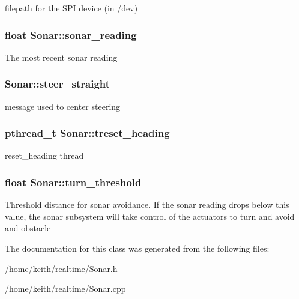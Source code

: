 filepath for the S\-P\-I device (in /dev) \hypertarget{classSonar_abd3f8ccfc42cacd700df9be06f70c6b2}{
\subsubsection[{sonar\-\_\-reading}]{\setlength{\rightskip}{0pt plus 5cm}float Sonar\-::sonar\-\_\-reading\hspace{0.3cm}{\ttfamily [protected]}}}\label{classSonar_abd3f8ccfc42cacd700df9be06f70c6b2}
The most recent sonar reading \hypertarget{classSonar_a9e6e96435c6767549c91d9e67d20161b}{
\subsubsection[{steer\-\_\-straight}]{ Sonar\-::steer\-\_\-straight\hspace{0.3cm}{\ttfamily [protected]}}}\label{classSonar_a9e6e96435c6767549c91d9e67d20161b}
message used to center steering \hypertarget{classSonar_af3ec5683614e9f1755e54da32184412a}{
\subsubsection[{treset\-\_\-heading}]{\setlength{\rightskip}{0pt plus 5cm}pthread\-\_\-t Sonar\-::treset\-\_\-heading\hspace{0.3cm}{\ttfamily [protected]}}}\label{classSonar_af3ec5683614e9f1755e54da32184412a}
reset\-\_\-heading thread \hypertarget{classSonar_a83151cbccbce08be16dfec04a53f3295}{
\subsubsection[{turn\-\_\-threshold}]{\setlength{\rightskip}{0pt plus 5cm}float Sonar\-::turn\-\_\-threshold\hspace{0.3cm}{\ttfamily [protected]}}}\label{classSonar_a83151cbccbce08be16dfec04a53f3295}
Threshold distance for sonar avoidance. If the sonar reading drops below this value, the sonar subsystem will take control of the actuators to turn and avoid and obstacle 

The documentation for this class was generated from the following files\-:\begin{DoxyCompactItemize}
\item 
/home/keith/realtime/Sonar.\-h\item 
/home/keith/realtime/Sonar.\-cpp\end{DoxyCompactItemize}
